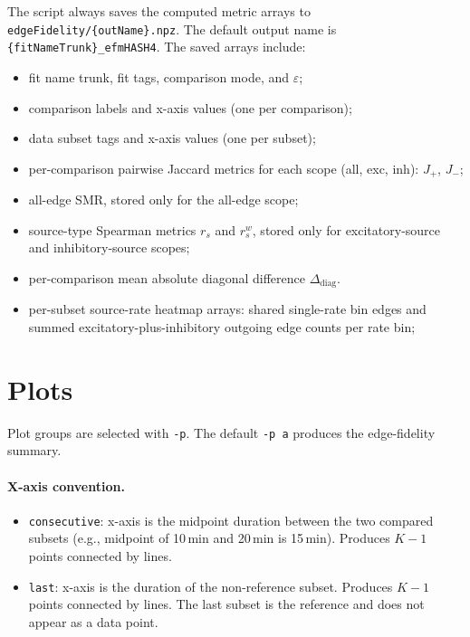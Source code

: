 \documentclass[11pt]{article}
\begin{document}
The script always saves the computed metric arrays to \texttt{edgeFidelity/\{outName\}.npz}. The default output name is \texttt{\{fitNameTrunk\}\_efmHASH4}. The saved arrays include:
\begin{itemize}
    \item fit name trunk, fit tags, comparison mode, and $\varepsilon$;
    \item comparison labels and x-axis values (one per comparison);
    \item data subset tags and x-axis values (one per subset);
    \item per-comparison pairwise Jaccard metrics for each scope (all, exc, inh): $J_+$, $J_-$;
    \item all-edge SMR, stored only for the all-edge scope;
    \item source-type Spearman metrics $r_s$ and $r_s^w$, stored only for excitatory-source and inhibitory-source scopes;
    \item per-comparison mean absolute diagonal difference $\Delta_{\text{diag}}$.
    \item per-subset source-rate heatmap arrays: shared single-rate bin edges and summed excitatory-plus-inhibitory outgoing edge counts per rate bin;
\end{itemize}

\section{Plots}
\label{sec:plots}

Plot groups are selected with \texttt{-p}. The default \texttt{-p a} produces the edge-fidelity summary.

\paragraph{X-axis convention.}
\begin{itemize}
    \item \texttt{consecutive}: x-axis is the midpoint duration between the two compared subsets (e.g., midpoint of 10\,min and 20\,min is 15\,min). Produces $K-1$ points connected by lines.
    \item \texttt{last}: x-axis is the duration of the non-reference subset. Produces $K-1$ points connected by lines. The last subset is the reference and does not appear as a data point.
\end{itemize}
\end{document}
